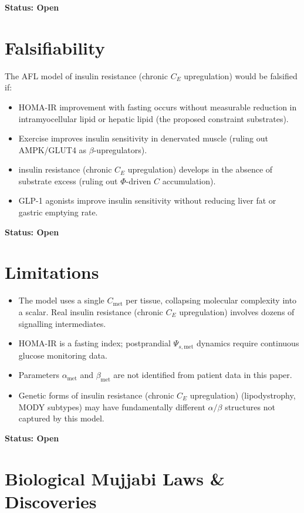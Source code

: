 \documentclass[11pt]{article}
\begin{document}
\textbf{Status: Open}

\section{Falsifiability}

The AFL model of insulin resistance (chronic $C_E$ upregulation) would be falsified if:
\begin{itemize}
    \item HOMA-IR improvement with fasting occurs without measurable reduction in intramyocellular lipid or hepatic lipid (the proposed constraint substrates).
    \item Exercise improves insulin sensitivity in denervated muscle (ruling out AMPK/GLUT4 as $\beta$-upregulators).
    \item insulin resistance (chronic $C_E$ upregulation) develops in the absence of substrate excess (ruling out $\Phi$-driven $C$ accumulation).
    \item GLP-1 agonists improve insulin sensitivity without reducing liver fat or gastric emptying rate.
\end{itemize}

\textbf{Status: Open}

\section{Limitations}

\begin{itemize}
    \item The model uses a single $C_{\mathrm{met}}$ per tissue, collapsing molecular complexity into a scalar. Real insulin resistance (chronic $C_E$ upregulation) involves dozens of signalling intermediates.
    \item HOMA-IR is a fasting index; postprandial $\Psi_{s,\mathrm{met}}$ dynamics require continuous glucose monitoring data.
    \item Parameters $\alpha_{\mathrm{met}}$ and $\beta_{\mathrm{met}}$ are not identified from patient data in this paper.
    \item Genetic forms of insulin resistance (chronic $C_E$ upregulation) (lipodystrophy, MODY subtypes) may have fundamentally different $\alpha/\beta$ structures not captured by this model.
\end{itemize}

\textbf{Status: Open}


\section{Biological Mujjabi Laws \& Discoveries}
\end{document}

